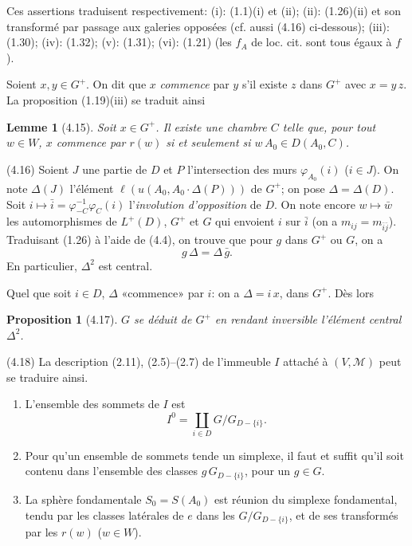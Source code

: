 \documentclass[12pt]{article}
\newtheorem{proposition}[theoreme]{Proposition}
\newtheorem{lemme}[theoreme]{Lemme}
\theoremstyle{remark}
\begin{document}
Ces assertions traduisent respectivement: (i): (1.1)(i) et (ii); (ii): (1.26)(ii) et son transformé par passage aux galeries opposées (cf. aussi (4.16) ci-dessous); (iii): (1.30); (iv): (1.32); (v): (1.31); (vi): (1.21) (les $f_A$ de loc. cit. sont tous égaux à $f$).

Soient $x, y \in G^+$. On dit que $x$ \emph{commence} par $y$ s'il existe $z$ dans $G^+$ avec $x = y \, z$. La proposition (1.19)(iii) se traduit ainsi

\begin{lemme}[4.15]
Soit $x \in G^+$. Il existe une chambre $C$ telle que, pour tout $w \in W$, $x$ commence par $r(w)$ si et seulement si $w \, A_0 \in D(A_0, C)$.
\end{lemme}

(4.16) Soient $J$ une partie de $D$ et $P$ l'intersection des murs $\varphi_{A_0}(i)$ ($i \in J$). On note $\Delta(J)$ l'élément $\ell(u(A_0, A_0 \cdot \Delta(P)))$ de $G^+$; on pose $\Delta = \Delta(D)$. Soit $i \mapsto \bar{i} = \varphi_{-C}^{-1} \varphi_C^{}(i)$ l'\emph{involution d'opposition} de $D$. On note encore $w \mapsto \bar{w}$ les automorphismes de $L^+(D)$, $G^+$ et $G$ qui envoient $i$ sur $\bar{i}$ (on a $m_{ij} = m_{\bar{i} \bar{j}}$). Traduisant (1.26) à l'aide de (4.4), on trouve que pour $g$ dans $G^+$ ou $G$, on a
\begin{equation}
g \, \Delta = \Delta \, \bar{g}.\tag{4.16.1}
\end{equation}
En particulier, $\Delta^2$ est central.

Quel que soit $i \in D$, $\Delta$ «commence» par $i$: on a $\Delta = i \, x$, dans $G^+$. Dès lors

\begin{proposition}[4.17]
$G$ se déduit de $G^+$ en rendant inversible l'élément central $\Delta^2$.
\end{proposition}

(4.18) La description (2.11), (2.5)--(2.7) de l'immeuble $I$ attaché à $(V, \mathcal{M})$ peut se traduire ainsi.
\begin{enumerate}
\item[a)] L'ensemble des sommets de $I$ est
\[I^0 = \coprod_{i \in D} G/G_{D-\{i\}}.\]
\item[b)] Pour qu'un ensemble de sommets tende un simplexe, il faut et suffit qu'il soit contenu dans l'ensemble des classes $g \, G_{D-\{i\}}$, pour un $g \in G$.
\item[c)] La sphère fondamentale $S_0 = S(A_0)$ est réunion du simplexe fondamental, tendu par les classes latérales de $e$ dans les $G/G_{D-\{i\}}$, et de ses transformés par les $r(w)$ ($w \in W$).
\end{enumerate}
\end{document}
